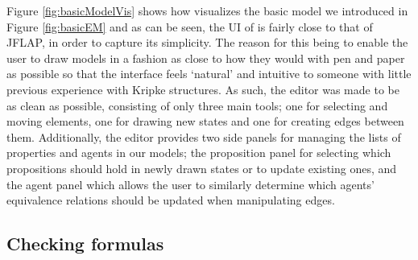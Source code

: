 Figure \ref{fig:basicModelVis} shows how \cname{} visualizes the basic model we introduced in Figure \ref{fig:basicEM} and as can be seen, the UI of \cname{} is fairly close to that of JFLAP, in order to capture its simplicity. The reason for this being to enable the user to draw models in a fashion as close to how they would with pen and paper as possible so that the interface feels `natural' and intuitive to someone with little previous experience with Kripke structures. As such, the editor was made to be as clean as possible, consisting of only three main tools; one for selecting and moving elements, one for drawing new states and one for creating edges between them. Additionally, the editor provides two side panels for managing the lists of properties and agents in our models; the proposition panel for selecting which propositions should hold in newly drawn states or to update existing ones, and the agent panel which allows the user to similarly determine which agents' equivalence relations should be updated when manipulating edges.

\subsection{Checking formulas}

